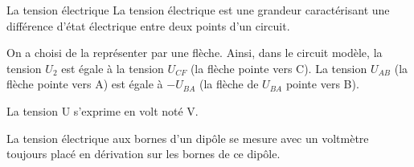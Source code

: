 \documentclass[24pt]{article}
\begin{document}
\begin{concept}{La tension électrique}
    La tension électrique est une grandeur caractérisant une différence d’état électrique entre
    deux points d’un circuit.

    On a choisi de la représenter par une flèche. Ainsi, dans le circuit modèle,
    la tension $U_2$ est égale à la tension $U_{CF}$ (la flèche pointe vers C).
    La tension $U_{AB}$ (la flèche pointe vers A) est égale à $-U_{BA}$
    (la flèche de $U_{BA}$ pointe vers B).

    La tension U s’exprime en volt noté V.

    La tension électrique aux bornes d’un dipôle se mesure avec un voltmètre
    toujours placé en dérivation sur les bornes de ce dipôle.
\end{concept}
\end{document}
